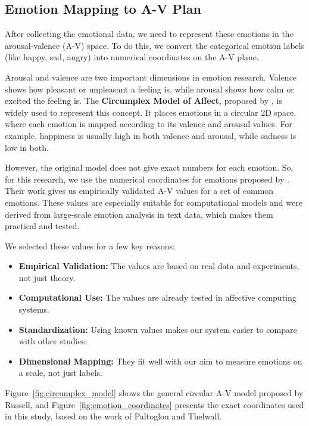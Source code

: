 \newpage
\subsection{Emotion Mapping to A-V Plan}\label{sec:emotion-mapping}

After collecting the emotional data, we need to represent these emotions in the arousal-valence (A-V) space. To do this, we convert the categorical emotion labels (like happy, sad, angry) into numerical coordinates on the A-V plane.

Arousal and valence are two important dimensions in emotion research. Valence shows how pleasant or unpleasant a feeling is, while arousal shows how calm or excited the feeling is. The \textbf{Circumplex Model of Affect}, proposed by \cite{russell1980circumplex}, is widely used to represent this concept. It places emotions in a circular 2D space, where each emotion is mapped according to its valence and arousal values. For example, happiness is usually high in both valence and arousal, while sadness is low in both.

However, the original model does not give exact numbers for each emotion. So, for this research, we use the numerical coordinates for emotions proposed by \cite{paltoglou2012seeing}. Their work gives us empirically validated A-V values for a set of common emotions. These values are especially suitable for computational models and were derived from large-scale emotion analysis in text data, which makes them practical and tested.

We selected these values for a few key reasons:

\begin{itemize}
    \item \textbf{Empirical Validation:} The values are based on real data and experiments, not just theory.
    \item \textbf{Computational Use:} The values are already tested in affective computing systems.
    \item \textbf{Standardization:} Using known values makes our system easier to compare with other studies.
    \item \textbf{Dimensional Mapping:} They fit well with our aim to measure emotions on a scale, not just labels.
\end{itemize}


Figure~\ref{fig:circumplex_model} shows the general circular A-V model proposed by Russell, and Figure~\ref{fig:emotion_coordinates} presents the exact coordinates used in this study, based on the work of Paltoglou and Thelwall.



